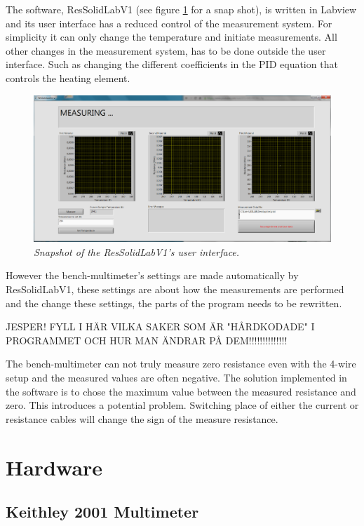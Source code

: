 \documentclass[a4paper,12pt]{article}
\begin{document}
The software, ResSolidLabV1 (see figure \ref{fig:UI} for a snap shot), is written in Labview and its user interface has a reduced control of the measurement system. For simplicity it can only change the temperature and initiate measurements. All other changes in the measurement system, has to be done outside the user interface. Such as changing the different coefficients in the PID equation that controls the heating element. 


\begin{figure}[H]
\center
\includegraphics[width=1\textwidth]{ResSolidLabV1UI.PNG}
\caption{\emph{Snapshot of the ResSolidLabV1's user interface.}}
\label{fig:UI}
\end{figure}

However the bench-multimeter's settings are made automatically by ResSolidLabV1, these settings are about how the measurements are performed and the change these settings, the parts of the program needs to be rewritten.

JESPER! FYLL I HÄR VILKA SAKER SOM ÄR "HÅRDKODADE" I PROGRAMMET OCH HUR MAN ÄNDRAR PÅ DEM!!!!!!!!!!!!!!

The  bench-multimeter can not truly measure zero resistance even with the 4-wire setup and the measured values are often negative. The solution implemented in the software is to chose the maximum value between the measured resistance and zero. This introduces a potential problem. Switching place of either the current or resistance cables will change the sign of the measure resistance.


\section{Hardware}

\subsection{Keithley 2001 Multimeter}
\end{document}
